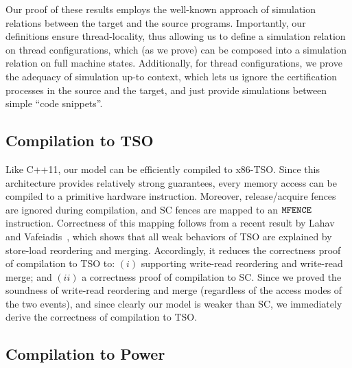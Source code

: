 Our proof of these results employs the well-known approach of simulation relations between the target and the source programs.
Importantly, our definitions ensure thread-locality, thus allowing us to define a simulation relation on thread configurations, which (as we prove)
can be composed into a simulation relation on full machine states.
Additionally, for thread configurations, we prove the adequacy of simulation up-to context,
which lets us ignore the certification processes in the source and the target, 
and just provide simulations between simple ``code snippets''.



\subsection{Compilation to TSO}
\label{sec:compilation_TSO}

Like C++11, our model can be efficiently compiled to x86-TSO.
Since this architecture provides relatively strong guarantees,
every memory access can be compiled to a primitive hardware instruction.
Moreover, release/acquire fences are ignored during compilation,
and SC fences are mapped to an $\texttt{MFENCE}$ instruction.
Correctness of this mapping follows from a recent result by Lahav and Vafeiadis~\cite{fm16},
which shows that all weak behaviors of TSO are explained by store-load reordering and merging.
Accordingly, it reduces the correctness proof of compilation to TSO to:
$(i)$ supporting write-read reordering and write-read merge;
and $(ii)$ a correctness proof of compilation to SC.
Since we proved the soundness of write-read reordering and merge 
(regardless of the access modes of the two events),
and since clearly our model is weaker than SC,
we immediately derive the correctness of compilation to TSO.

\subsection{Compilation to Power}
\label{sec:compilation_POWER}

